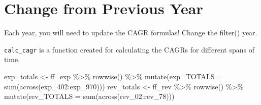 \documentclass[
  letterpaper,
  DIV=11,
  numbers=noendperiod]{scrreport}
\newenvironment{Shaded}{\begin{snugshade}}{\end{snugshade}}
\newcommand{\AttributeTok}[1]{\textcolor[rgb]{0.40,0.45,0.13}{#1}}
\newcommand{\FunctionTok}[1]{\textcolor[rgb]{0.28,0.35,0.67}{#1}}
\newcommand{\NormalTok}[1]{\textcolor[rgb]{0.00,0.23,0.31}{#1}}
\newcommand{\OtherTok}[1]{\textcolor[rgb]{0.00,0.23,0.31}{#1}}
\newcommand{\SpecialCharTok}[1]{\textcolor[rgb]{0.37,0.37,0.37}{#1}}
\begin{document}
\hypertarget{change-from-previous-year}{%
\section{Change from Previous Year}\label{change-from-previous-year}}

Each year, you will need to update the CAGR formulas! Change the
filter() year.

\texttt{calc\_cagr} is a function created for calculating the CAGRs for
different spans of time.

\begin{Shaded}
\begin{Highlighting}[]
\NormalTok{exp\_totals }\OtherTok{\textless{}{-}}\NormalTok{ ff\_exp }\SpecialCharTok{\%\textgreater{}\%} \FunctionTok{rowwise}\NormalTok{() }\SpecialCharTok{\%\textgreater{}\%} \FunctionTok{mutate}\NormalTok{(}\AttributeTok{exp\_TOTALS =} \FunctionTok{sum}\NormalTok{(}\FunctionTok{across}\NormalTok{(exp\_402}\SpecialCharTok{:}\NormalTok{exp\_970)))}
\NormalTok{rev\_totals }\OtherTok{\textless{}{-}}\NormalTok{ ff\_rev }\SpecialCharTok{\%\textgreater{}\%}    \FunctionTok{rowwise}\NormalTok{() }\SpecialCharTok{\%\textgreater{}\%} 
  \FunctionTok{mutate}\NormalTok{(}\AttributeTok{rev\_TOTALS =} \FunctionTok{sum}\NormalTok{(}\FunctionTok{across}\NormalTok{(rev\_02}\SpecialCharTok{:}\NormalTok{rev\_78)))}




\end{Highlighting}
\end{Shaded}
\end{document}
